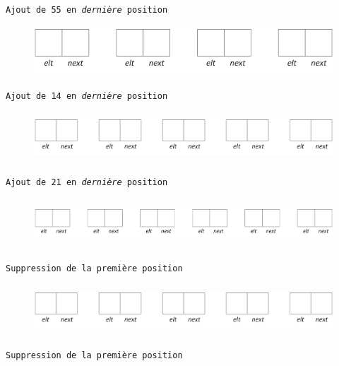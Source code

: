 \documentclass[11pt,a4paper]{article}
\begin{document}
\begin{center}

\texttt{Ajout de 55 en \textit{dernière} position}

\begin{figure}[ht!]
\centering
\centerline{  %
\includegraphics[height=1.85cm]{img/Liste_p_vide_4.png}
}
\end{figure}


\texttt{Ajout de 14 en \textit{dernière} position}

\begin{figure}[ht!]
\centering
\centerline{  %
\includegraphics[height=1.85cm]{img/Liste_p_vide_5.png}
}
\end{figure}


\texttt{Ajout de 21 en \textit{dernière} position}

\begin{figure}[ht!]
\centering
\centerline{  %
\includegraphics[height=1.85cm]{img/Liste_p_vide_6.png}
}
\end{figure}


\texttt{Suppression de la première position}

\begin{figure}[ht!]
\centering
\centerline{  %
\includegraphics[height=1.85cm]{img/Liste_p_vide_5.png}
}
\end{figure}


\texttt{Suppression de la première position}


\end{center}
\end{document}
